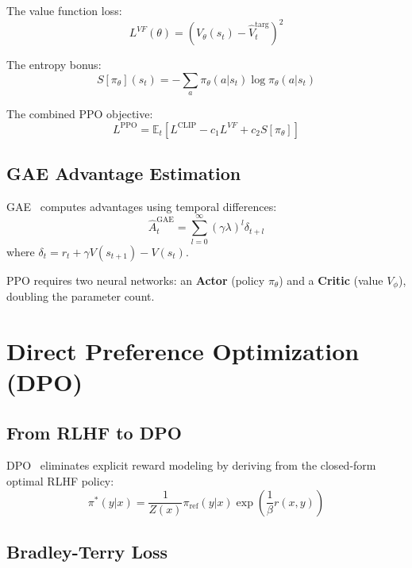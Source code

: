 \documentclass[10pt,twocolumn]{article}
\begin{document}
The value function loss:
\begin{equation}
L^{VF}(\theta) = \left(V_\theta(s_t) - \hat{V}_t^{\text{targ}}\right)^2
\end{equation}

The entropy bonus:
\begin{equation}
S[\pi_\theta](s_t) = -\sum_a \pi_\theta(a|s_t)\log\pi_\theta(a|s_t)
\end{equation}

The combined PPO objective:
\begin{equation}
L^{\text{PPO}} = \mathbb{E}_t\left[L^{\text{CLIP}} - c_1 L^{VF} + c_2 S[\pi_\theta]\right]
\label{eq:ppo}
\end{equation}

\subsection{GAE Advantage Estimation}

GAE~\cite{schulman2016gae} computes advantages using temporal differences:
\begin{equation}
\hat{A}_t^{\text{GAE}} = \sum_{l=0}^{\infty}(\gamma\lambda)^l\delta_{t+l}
\end{equation}
where $\delta_t = r_t + \gamma V(s_{t+1}) - V(s_t)$.

PPO requires two neural networks: an \textbf{Actor} (policy $\pi_\theta$) and a \textbf{Critic} (value $V_\phi$), doubling the parameter count.

\section{Direct Preference Optimization (DPO)}
\label{sec:dpo}

\subsection{From RLHF to DPO}

DPO~\cite{rafailov2023dpo} eliminates explicit reward modeling by deriving from the closed-form optimal RLHF policy:
\begin{equation}
\pi^*(y|x) = \frac{1}{Z(x)}\pi_{\text{ref}}(y|x)\exp\!\left(\frac{1}{\beta}r(x,y)\right)
\end{equation}

\subsection{Bradley-Terry Loss}
\end{document}

